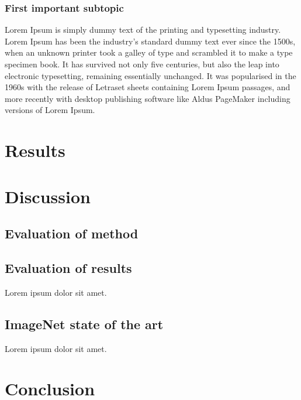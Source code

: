 \documentclass{kthreport}
\begin{document}
\subsubsection{First important subtopic}

Lorem Ipsum is simply dummy text of the printing and typesetting industry. Lorem Ipsum has been the industry's standard dummy text ever since the 1500s, when an unknown printer took a galley of type and scrambled it to make a type specimen book. It has survived not only five centuries, but also the leap into electronic typesetting, remaining essentially unchanged. It was popularised in the 1960s with the release of Letraset sheets containing Lorem Ipsum passages, and more recently with desktop publishing software like Aldus PageMaker including versions of Lorem Ipsum.

\section{Results}

\section{Discussion}

\subsection{Evaluation of method}

\subsection{Evaluation of results}

Lorem ipsum dolor sit amet.

\subsection{ImageNet state of the art}

Lorem ipsum dolor sit amet.

\section{Conclusion} 

{}

\end{document}
